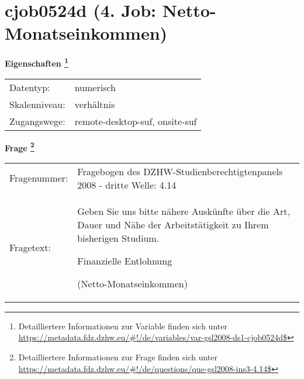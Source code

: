 
    \setcounter{footnote}{0}

    \vspace*{-1.8cm}
	\section{cjob0524d (4. Job: Netto-Monatseinkommen)}
	\label{section:cjob0524d}



    \vspace*{0.5cm}
    \noindent\textbf{Eigenschaften
	\footnote{Detailliertere Informationen zur Variable finden sich unter
		\url{https://metadata.fdz.dzhw.eu/\#!/de/variables/var-gsl2008-ds1-cjob0524d$}}}\\
	\begin{tabularx}{\hsize}{@{}lX}
	Datentyp: & numerisch \\
	Skalenniveau: & verhältnis \\
	Zugangswege: &
	  remote-desktop-suf, 
	  onsite-suf
 \\
    \end{tabularx}



				\vspace*{0.5cm}
                \noindent\textbf{Frage
	                \footnote{Detailliertere Informationen zur Frage finden sich unter
		              \url{https://metadata.fdz.dzhw.eu/\#!/de/questions/que-gsl2008-ins3-4.14$}}}\\
				\begin{tabularx}{\hsize}{@{}lX}
					Fragenummer: &
					  Fragebogen des DZHW-Studienberechtigtenpanels 2008 - dritte Welle:
					  4.14
 \\
					Fragetext: & Geben Sie uns bitte nähere Auskünfte über die Art, Dauer und Nähe der Arbeitstätigkeit zu Ihrem bisherigen Studium.\par  Finanzielle Entlohnung\par  (Netto-Monatseinkommen) \\
				\end{tabularx}






